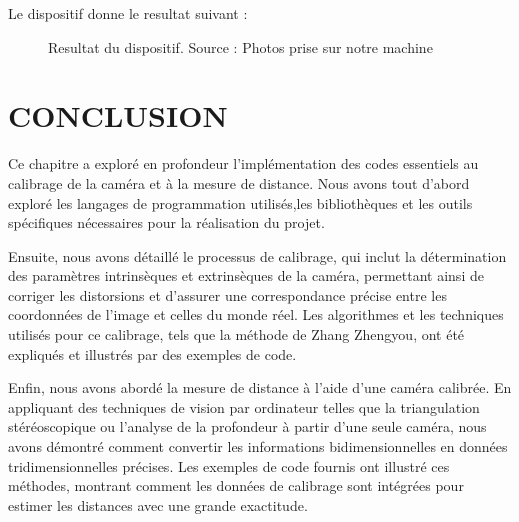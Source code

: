 
 Le dispositif donne le resultat suivant :
 
 \begin{figure}[H]%
 	\center%
 	\setlength{\fboxsep}{5pt}%
 	\setlength{\fboxrule}{0.5pt}%
 	\caption[Resultat du dispositif]{Resultat du dispositif. Source : Photos prise sur notre machine}
 	\label{fig:Resultat du dispositif}
 \end{figure}
 
 
 \newpage
\section{CONCLUSION}
 
 Ce chapitre a exploré en profondeur l'implémentation des codes essentiels au calibrage de la caméra et à la mesure de distance. Nous avons tout d'abord exploré les langages de programmation utilisés,les bibliothèques et les outils spécifiques nécessaires pour la réalisation du projet.
 
 Ensuite, nous avons détaillé le processus de calibrage, qui inclut la détermination des paramètres intrinsèques et extrinsèques de la caméra, permettant ainsi de corriger les distorsions et d'assurer une correspondance précise entre les coordonnées de l'image et celles du monde réel. Les algorithmes et les techniques utilisés pour ce calibrage, tels que la méthode de Zhang Zhengyou, ont été expliqués et illustrés par des exemples de code.
 
 Enfin, nous avons abordé la mesure de distance à l'aide d'une caméra calibrée. En appliquant des techniques de vision par ordinateur telles que la triangulation stéréoscopique ou l'analyse de la profondeur à partir d'une seule caméra, nous avons démontré comment convertir les informations bidimensionnelles en données tridimensionnelles précises. Les exemples de code fournis ont illustré ces méthodes, montrant comment les données de calibrage sont intégrées pour estimer les distances avec une grande exactitude.
 
  